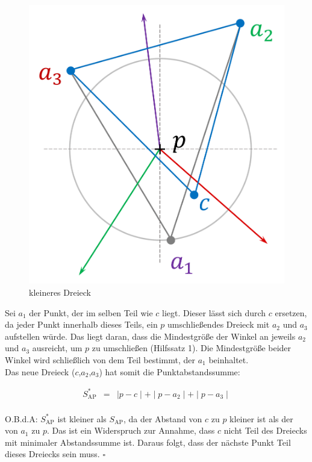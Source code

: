 \documentclass[a4paper]{extarticle}
\begin{document}
    \begin{figure}[!ht]
        \centering	
        \includegraphics[scale=0.15]{bilder/tri_3.pdf}
        \caption{kleineres Dreieck}
        \label{fig:triangulation_3}
    \end{figure}

    Sei $a_1$ der Punkt, der im selben Teil wie $c$ liegt. Dieser lässt sich durch $c$ ersetzen, 
    da jeder Punkt innerhalb dieses Teils, ein $p$ umschließendes Dreieck mit $a_2$ und $a_3$ 
    aufstellen würde. Das liegt daran, dass die Mindestgröße der 
    Winkel an jeweils $a_2$ und $a_3$ ausreicht, um $p$ zu umschließen (Hilfssatz 1).
    Die Mindestgröße beider Winkel wird schließlich von dem Teil bestimmt, der $a_1$ beinhaltet. \\
    Das neue Dreieck ($c$,$a_2$,$a_3$) hat somit die Punktabstandssumme:

    \begin{eqnarray*}
        S^*_{\text{AP}} &=& \mid p - c \mid + \mid p - a_2 \mid + \mid p - a_3 \mid \\
    \end{eqnarray*}

    O.B.d.A: $S^*_{\text{AP}}$ ist kleiner als $S_{\text{AP}}$, da der Abstand von $c$ zu $p$
    kleiner ist als der von $a_1$ zu $p$. Das ist ein Widerspruch zur Annahme, dass $c$ nicht
    Teil des Dreiecks mit minimaler Abstandssumme ist. Daraus folgt, dass der nächste
    Punkt Teil dieses Dreiecks sein muss. $\square$
\end{document}

